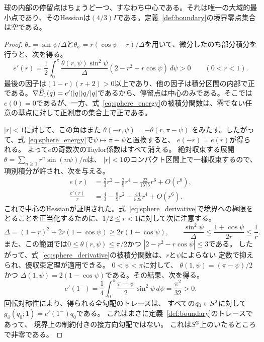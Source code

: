 \begin{proposition}\label{prop:sphere}
球の内部の停留点はちょうど一つ、すなわち中心である。それは唯一の大域的最小点であり、そのHessianは$(4/3)I$である。定義~\ref{def:boundary}の境界零点集合は空である。
\end{proposition}
\begin{proof}
$\theta_r=\sin\psi/\Delta$と$\theta_\psi=r(\cos\psi-r)/\Delta$を用いて、微分したのち部分積分を行うと、次を得る。
\begin{equation}\label{eq:sphere_derivative}
 e'(r)=\frac12\int_0^\pi
 \frac{\theta(r,\psi)\sin^2\psi}{\Delta}
 (2-r^2-r\cos\psi)\,d\psi>0\qquad(0<r<1).
\end{equation}
最後の因子は$(1-r)(r+2)>0$以上であり、他の因子は積分区間の内部で正である。$\nabla\widehat E_1(q)=e'(|q|)q/|q|$であるから、停留点は中心のみである。そこでは$e(0)=0$であるが、一方、式~\eqref{eq:sphere_energy}の被積分関数は、零でない任意の基点に対して正測度の集合上で正である。

$|r|<1$に対して、この角はまた
$\theta(-r,\psi)=-\theta(r,\pi-\psi)$
をみたす。したがって、式~\eqref{eq:sphere_energy}で$\psi\mapsto\pi-\psi$と置換すると、
$e(-r)=e(r)$が得られる。
よって$e$の奇数次のTaylor係数はすべて消える。
絶対収束する展開
$\theta=\sum_{n\ge1}r^n\sin(n\psi)/n$は、
$|r|<1$のコンパクト区間上で一様収束するので、
項別積分が許され、次を与える。
\begin{align}
 e(r)&=\frac23r^2-\frac29r^4-\frac{22}{1575}r^6+O(r^8),\label{eq:sphere_series}\\
 \frac{e'(r)}r&=\frac43-\frac89r^2-\frac{44}{525}r^4+O(r^6).\nonumber
\end{align}
これで中心のHessianが証明された。式~\eqref{eq:sphere_derivative}で境界への極限を
とることを正当化するために、$1/2\le r<1$に対して次に注意する。
\[
 \Delta=(1-r)^2+2r(1-\cos\psi)\ge2r(1-\cos\psi),
 \qquad
 \frac{\sin^2\psi}{\Delta}
 \le\frac{1+\cos\psi}{2r}\le\frac1r.
\]
また、この範囲では$0\le\theta(r,\psi)\le\pi/2$かつ
$|2-r^2-r\cos\psi|\le3$である。
したがって、式~\eqref{eq:sphere_derivative}の被積分関数は、$r$と$\psi$によらない
定数で抑えられ、優収束定理が適用できる。
$0<\psi<\pi$に対して、
$\theta(1,\psi)=(\pi-\psi)/2$かつ
$\Delta(1,\psi)=2(1-\cos\psi)$である。その結果、次を得る。
\[
 e'(1^-)=\frac14\int_0^\pi\frac{\pi-\psi}{2}\sin^2\psi\,d\psi
 =\frac{\pi^2}{32}>0.
\]
回転対称性により、得られる全勾配のトレースは、
すべての$q_0\in S^2$に対して$g_\partial(q_0;1)=e'(1^-)q_0$である。
これはまさに定義~\ref{def:boundary}のトレースであって、
境界上の制約付きの接方向勾配ではない。
これは$S^2$上のいたるところで非零である。
\end{proof}

